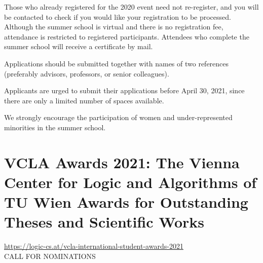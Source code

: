\documentclass[prodmode,acmtecs]{acmsmall} %
\begin{document}
\begin{itemize}
  Those who already registered for the 2020 event need not re-register, and you will be contacted to check if you would like your registration to be processed. Although the summer school is virtual and there is no registration fee, attendance is restricted to registered participants. Attendees who complete the summer school will receive a certificate by mail.  
 
  Applications should be submitted together with names of two references (preferably advisors, professors, or senior colleagues).   
 
  Applicants are urged to submit their applications before April 30, 2021, since there are only a limited number of spaces available.  
 
  We strongly encourage the participation of women and under-represented minorities in the summer school. 
 
\end{itemize}\section{VCLA Awards 2021: The Vienna Center for Logic and Algorithms of TU Wien Awards for Outstanding Theses and Scientific Works}\label{VCLAAwards2021}  \href{https://logic-cs.at/vcla-international-student-awards-2021}{https://logic-cs.at/vcla-international-student-awards-2021}\\ 
CALL FOR NOMINATIONS 
\end{document}
